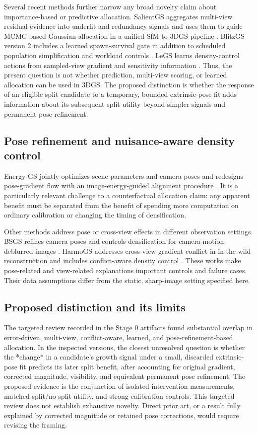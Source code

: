\documentclass[10pt]{article}
\begin{document}
Several recent methods further narrow any broad novelty claim about
importance-based or predictive allocation. SalientGS aggregates multi-view
residual evidence into underfit and redundancy signals and uses them to guide
MCMC-based Gaussian allocation in a unified SfM-to-3DGS pipeline
\cite{xiong2026salientgs}. BlitzGS version 2 includes a learned
spawn-survival gate in addition to scheduled population simplification and
workload controls \cite{wang2026blitzgs}. LeGS learns density-control actions
from sampled-view gradient and sensitivity information
\cite{ning2026legs}. Thus, the present question is not whether prediction,
multi-view scoring, or learned allocation can be used in 3DGS. The proposed
distinction is whether the response of an eligible split candidate to a
temporary, bounded extrinsic-pose fit adds information about its subsequent
split utility beyond simpler signals and permanent pose refinement.

\subsection{Pose refinement and nuisance-aware density control}

Energy-GS jointly optimizes scene parameters and camera poses and redesigns
pose-gradient flow with an image-energy-guided alignment procedure
\cite{gao2026energygs}. It is a particularly relevant challenge to a
counterfactual allocation claim: any apparent benefit must be separated from
the benefit of spending more computation on ordinary calibration or changing
the timing of densification.

Other methods address pose or cross-view effects in different observation
settings. BSGS refines camera poses and controls densification for
camera-motion-deblurred images \cite{zhao2025bsgs}. HarmoGS addresses
cross-view gradient conflict in in-the-wild reconstruction and includes
conflict-aware density control \cite{kang2026harmogs}. These works make
pose-related and view-related explanations important controls and failure
cases. Their data assumptions differ from the static, sharp-image setting
specified here.

\subsection{Proposed distinction and its limits}

The targeted review recorded in the Stage 0 artifacts found substantial
overlap in error-driven, multi-view, conflict-aware, learned, and
pose-refinement-based allocation. In the inspected versions, the closest
unresolved question is whether the *change* in a candidate's growth signal
under a small, discarded extrinsic-pose fit predicts its later split benefit,
after accounting for original gradient, corrected magnitude, visibility, and
equivalent permanent pose refinement. The proposed evidence is the conjunction
of isolated intervention measurements, matched split/no-split utility,
and strong calibration controls. This targeted review does not establish
exhaustive novelty. Direct prior art, or a result fully explained by corrected
magnitude or retained pose corrections, would require revising the framing.
\end{document}
